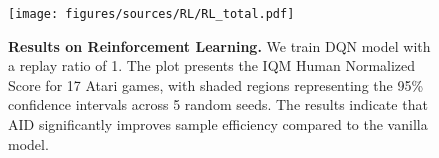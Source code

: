 \begin{figure}[h]
    \centering
    \texttt{[image: figures/sources/RL/RL\_total.pdf]}
    \caption{\textbf{Results on Reinforcement Learning.} We train DQN model with a replay ratio of 1.  The plot presents the IQM Human Normalized Score for 17 Atari games, with shaded regions representing the 95\% confidence intervals across 5 random seeds. The results indicate that AID significantly improves sample efficiency compared to the vanilla model.}
    \label{fig:RL_total}
\end{figure}